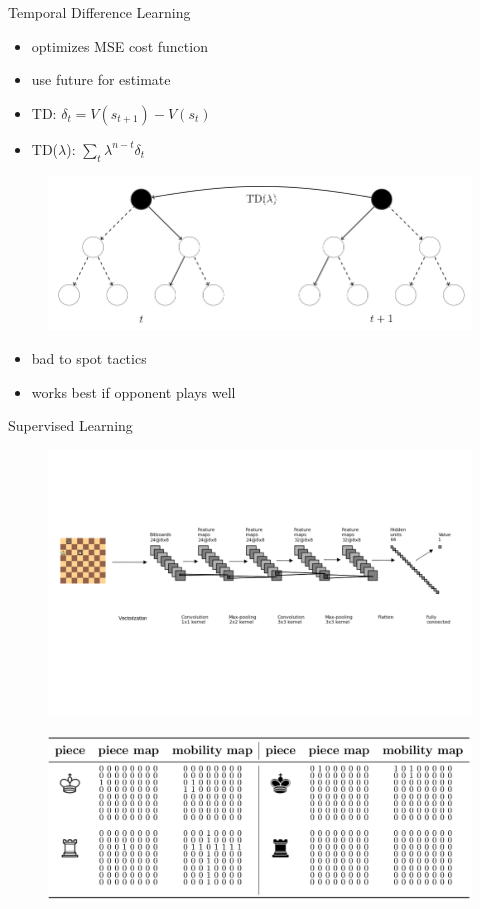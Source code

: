 \documentclass{beamer}
\newcommand\con{\item[\color{red}$-$]}
\begin{document}
\begin{frame}{Temporal Difference Learning}
	\begin{itemize}
		\item optimizes MSE cost function
		\item use future for estimate
		\item TD: $\delta_t=V(s_{t+1})-V(s_t)$
		\item TD($\lambda$): $\sum_{t}\lambda^{n-t}\delta_t$
	\end{itemize}
	\begin{figure}
		\centering
		\includegraphics[scale=0.3]{abstracts/tdlambda}
	\end{figure}
	\begin{itemize}
		\con bad to spot tactics
		\con works best if opponent plays well
	\end{itemize}
\end{frame}

\begin{frame}{Supervised Learning}
\begin{figure}
		\includegraphics[trim={0 7cm 0 7cm},clip,scale=0.3]{cnn2}
	\end{figure}
    \begin{figure}[!htb]
\includegraphics[scale=0.25]{feat}
\end{figure}
\end{frame}
\end{document}
